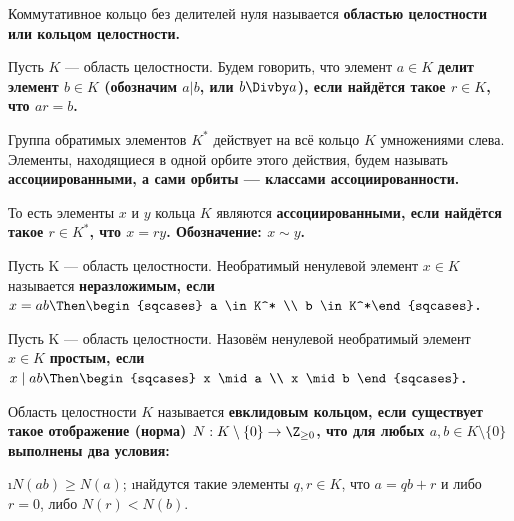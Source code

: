 \begin{defn}
Коммутативное кольцо без делителей нуля называется \bf{областью целостности} или \bf{кольцом целостности}.
\end{defn}

\begin{defn}
Пусть \(K\) --- область целостности. Будем говорить, что элемент \(a\in K\) \bf{делит} элемент \(b\in K\) (обозначим $a | b$, или $b \Divby a$), если найдётся такое \(r \in K\), что \(ar=b\).

Группа обратимых элементов \(K^*\) действует на всё кольцо \(K\) умножениями слева. Элементы, находящиеся в одной орбите этого действия, будем называть \bf{ассоциированными}, а сами орбиты --- \bf{классами ассоциированности}.

То есть элементы \(x\) и \(y\) кольца \(K\) являются \bf{ассоциированными}, если найдётся такое \(r \in K^*\), что \(x=ry\). Обозначение: \(x \sim y\).
\end{defn}

\begin{defn}
Пусть K --- область целостности. Необратимый ненулевой элемент \(x \in K\) называется \bf{неразложимым}, если \(x=ab \Then \begin{sqcases} a \in K^* \\ b \in K^*\end{sqcases}\).
\end{defn}

\begin{defn}
Пусть K --- область целостности. Назовём ненулевой необратимый элемент \(x \in K\) \bf{простым}, если \(x \mid ab \Then \begin{sqcases} x \mid a \\ x \mid b \end{sqcases}\).
\end{defn}

\begin{defn}
Область целостности \(K\) называется \bf{евклидовым кольцом}, если существует такое отображение (\bf{норма}) \(N : K \setminus \{0\} \rightarrow \Z_{\ge 0}\), что для любых \(a,b \in K \setminus \{0\}\) выполнены два условия:
\begin{enumerate}
\i \(N(ab) \ge N(a)\);
\i найдутся такие элементы \(q , r\in K\), что \(a=qb+r\) и либо \(r=0\), либо \(N(r) < N(b)\).
\end{enumerate}
\end{defn}

